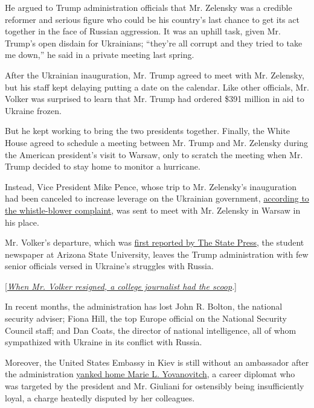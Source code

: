 He argued to Trump administration officials that Mr. Zelensky was a
credible reformer and serious figure who could be his country's last
chance to get its act together in the face of Russian aggression. It was
an uphill task, given Mr. Trump's open disdain for Ukrainians; ``they're
all corrupt and they tried to take me down,'' he said in a private
meeting last spring.

After the Ukrainian inauguration, Mr. Trump agreed to meet with Mr.
Zelensky, but his staff kept delaying putting a date on the calendar.
Like other officials, Mr. Volker was surprised to learn that Mr. Trump
had ordered \$391 million in aid to Ukraine frozen.

But he kept working to bring the two presidents together. Finally, the
White House agreed to schedule a meeting between Mr. Trump and Mr.
Zelensky during the American president's visit to Warsaw, only to
scratch the meeting when Mr. Trump decided to stay home to monitor a
hurricane.

Instead, Vice President Mike Pence, whose trip to Mr. Zelensky's
inauguration had been canceled to increase leverage on the Ukrainian
government,
\href{https://www.nytimes.com/interactive/2019/09/26/us/politics/whistle-blower-complaint.html?action=click\&module=RelatedLinks\&pgtype=Article}{according
to the whistle-blower complaint}, was sent to meet with Mr. Zelensky in
Warsaw in his place.

Mr. Volker's departure, which was
\href{https://www.statepress.com/article/2019/09/sppolitics-mccain-head-steps-down}{first
reported by The State Press}, the student newspaper at Arizona State
University, leaves the Trump administration with few senior officials
versed in Ukraine's struggles with Russia.

{[}\href{https://www.nytimes.com/2019/09/28/us/asu-ukraine-volker.html}{\emph{When
Mr. Volker resigned, a college journalist had the scoop}}.{]}

In recent months, the administration has lost John R. Bolton, the
national security adviser; Fiona Hill, the top Europe official on the
National Security Council staff; and Dan Coats, the director of national
intelligence, all of whom sympathized with Ukraine in its conflict with
Russia.

Moreover, the United States Embassy in Kiev is still without an
ambassador after the administration
\href{https://www.nytimes.com/2019/09/26/us/politics/yovanovitch-trump-ukraine-ambassador.html}{yanked
home Marie L. Yovanovitch}, a career diplomat who was targeted by the
president and Mr. Giuliani for ostensibly being insufficiently loyal, a
charge heatedly disputed by her colleagues.


